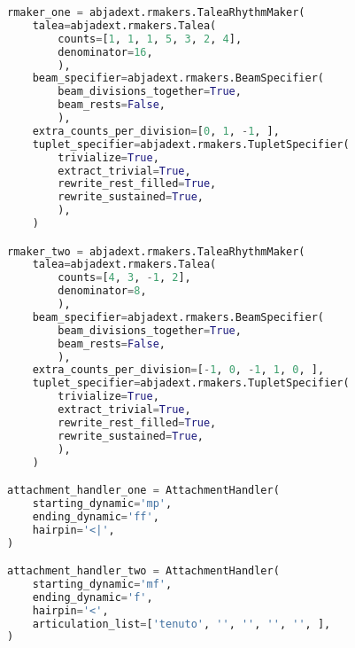 \begin{lstlisting}[language=Python, caption=Invocation Source Code]
rmaker_one = abjadext.rmakers.TaleaRhythmMaker(
    talea=abjadext.rmakers.Talea(
        counts=[1, 1, 1, 5, 3, 2, 4],
        denominator=16,
        ),
    beam_specifier=abjadext.rmakers.BeamSpecifier(
        beam_divisions_together=True,
        beam_rests=False,
        ),
    extra_counts_per_division=[0, 1, -1, ],
    tuplet_specifier=abjadext.rmakers.TupletSpecifier(
        trivialize=True,
        extract_trivial=True,
        rewrite_rest_filled=True,
        rewrite_sustained=True,
        ),
    )

rmaker_two = abjadext.rmakers.TaleaRhythmMaker(
    talea=abjadext.rmakers.Talea(
        counts=[4, 3, -1, 2],
        denominator=8,
        ),
    beam_specifier=abjadext.rmakers.BeamSpecifier(
        beam_divisions_together=True,
        beam_rests=False,
        ),
    extra_counts_per_division=[-1, 0, -1, 1, 0, ],
    tuplet_specifier=abjadext.rmakers.TupletSpecifier(
        trivialize=True,
        extract_trivial=True,
        rewrite_rest_filled=True,
        rewrite_sustained=True,
        ),
    )

attachment_handler_one = AttachmentHandler(
    starting_dynamic='mp',
    ending_dynamic='ff',
    hairpin='<|',
)

attachment_handler_two = AttachmentHandler(
    starting_dynamic='mf',
    ending_dynamic='f',
    hairpin='<',
    articulation_list=['tenuto', '', '', '', '', ],
)


\end{lstlisting}
